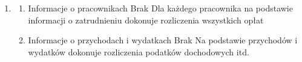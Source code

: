 \documentclass[a4paper,11pt]{article}
\begin{document}
\begin{enumerate}
\begin{enumerate}
\begin{enumerate}
                \end{enumerate}
            \item {}
                \begin{enumerate}
                    \item {} {Informacje o pracownikach} {Brak} {Dla każdego pracownika na podstawie informacji o zatrudnieniu dokonuje rozliczenia wszystkich opłat}
                    \item {} {Informacje o przychodach i wydatkach} {Brak} {Na podstawie przychodów i wydatków dokonuje rozliczenia podatków dochodowych itd.}
                \end{enumerate}
        \end{enumerate}
\end{enumerate}
 
\end{document}
